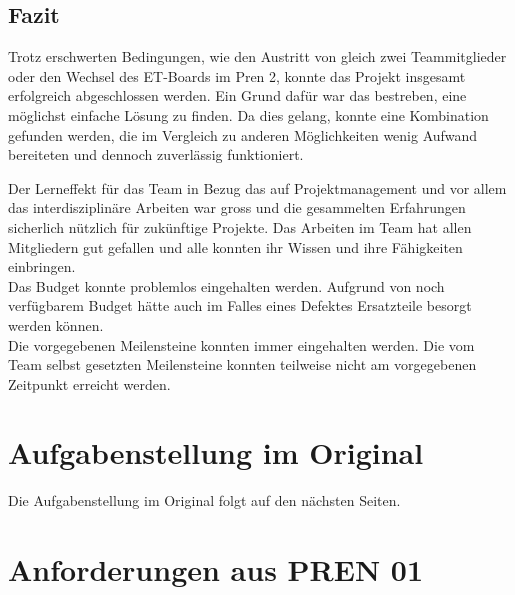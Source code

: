 \documentclass[a4paper]{report}
\begin{document}
\section{Fazit}
Trotz erschwerten Bedingungen, wie den Austritt von gleich zwei Teammitglieder oder den Wechsel des ET-Boards im Pren 2, konnte das Projekt insgesamt erfolgreich abgeschlossen werden. Ein Grund dafür war das bestreben, eine möglichst einfache Lösung zu finden. Da dies gelang, konnte eine Kombination gefunden werden, die im Vergleich zu anderen Möglichkeiten wenig Aufwand bereiteten und dennoch zuverlässig funktioniert.

Der Lerneffekt für das Team in Bezug das auf Projektmanagement und vor allem das interdisziplinäre Arbeiten war gross und die gesammelten Erfahrungen sicherlich nützlich für zukünftige Projekte. Das Arbeiten im Team hat allen Mitgliedern gut gefallen und alle konnten ihr Wissen und ihre Fähigkeiten einbringen.\\

Das Budget konnte problemlos eingehalten werden. Aufgrund von noch verfügbarem Budget hätte auch im Falles eines Defektes Ersatzteile besorgt werden können.\\
Die vorgegebenen Meilensteine konnten immer eingehalten werden. Die vom Team selbst gesetzten Meilensteine konnten teilweise nicht am vorgegebenen Zeitpunkt erreicht werden.


\listoffigures

\listoftables

\printbibliography

\appendix

\chapter{Aufgabenstellung im Original}
\label{app:ch:AufgabenOriginal}
Die Aufgabenstellung im Original folgt auf den nächsten Seiten.





\chapter{Anforderungen aus PREN 01}
\label{app:ch:Anforderungen}
\end{document}
